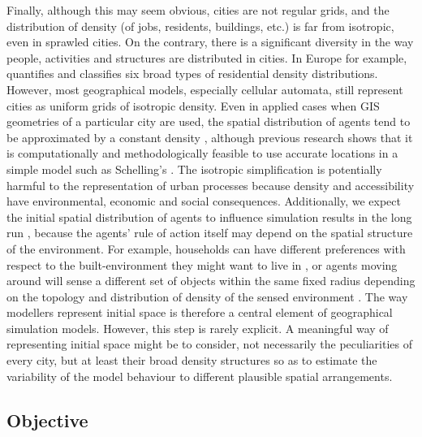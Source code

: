 \documentclass{JASSS}
\begin{document}
Finally, although this may seem obvious, cities are not regular grids, and the distribution of density (of jobs, residents, buildings, etc.) is far from isotropic, even in sprawled cities. On the contrary, there is a significant diversity in the way people, activities and structures are distributed in cities. In Europe for example, \citet{LeNechet2015} quantifies and classifies six broad types of residential density distributions. However, most geographical models, especially cellular automata, still represent cities as uniform grids of isotropic density. Even in applied cases when GIS geometries of a particular city are used, the spatial distribution of agents tend to be approximated by a constant density \citep{arribas2014diverse}, although previous research shows that it is computationally and methodologically feasible to use accurate locations in a simple model such as Schelling's \citep{benenson2002entity}. The isotropic simplification is potentially harmful to the representation of urban processes because density and accessibility have environmental, economic and social consequences. Additionally, we expect the initial spatial distribution of agents to influence simulation results in the long run \citep{Castellanoetal2009}, because the agents' rule of action itself may depend on the spatial structure of the environment. For example, households can have different preferences with respect to the built-environment they might want to live in \citep{SpielmanHarrison2014}, or agents moving around will sense a different set of objects within the same fixed radius depending on the topology \citep{Banos2012} and distribution of density of the sensed environment \citep{LauriJaggi2003, FossettDietrich2009}. The way modellers represent initial space is therefore a central element of geographical simulation models. However, this step is rarely explicit. A meaningful way of representing initial space might be to consider, not necessarily the peculiarities of every city, but at least their broad density structures so as to estimate the variability of the model behaviour to different plausible spatial arrangements.

\subsection{Objective}
\end{document}
